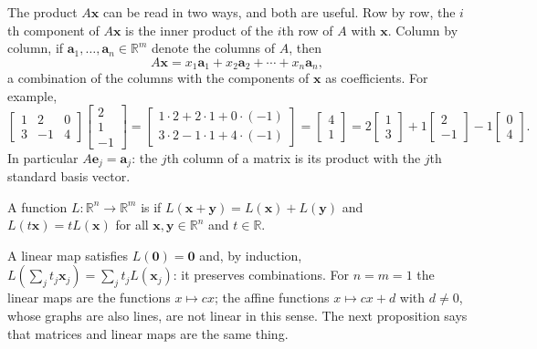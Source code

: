 The product $A\mathbf x$ can be read in two ways, and both are useful. Row by row, the $i$th component of $A\mathbf x$ is the inner product of the $i$th row of $A$ with $\mathbf x$. Column by column, if $\mathbf a_1,\ldots,\mathbf a_n\in\mathbb R^m$ denote the columns of $A$, then
\[
A\mathbf x=x_1\mathbf a_1+x_2\mathbf a_2+\cdots+x_n\mathbf a_n ,
\]
a combination of the columns with the components of $\mathbf x$ as coefficients. For example,
\[
\begin{bmatrix}1&2&0\\3&-1&4\end{bmatrix}\begin{bmatrix}2\\1\\-1\end{bmatrix}=\begin{bmatrix}1\cdot2+2\cdot1+0\cdot(-1)\\3\cdot2-1\cdot1+4\cdot(-1)\end{bmatrix}=\begin{bmatrix}4\\1\end{bmatrix}=2\begin{bmatrix}1\\3\end{bmatrix}+1\begin{bmatrix}2\\-1\end{bmatrix}-1\begin{bmatrix}0\\4\end{bmatrix}.
\]
In particular $A\mathbf e_j=\mathbf a_j$: the $j$th column of a matrix is its product with the $j$th standard basis vector.

\begin{definition}
\label{def:linear-map}
A function $L\colon\mathbb R^n\to\mathbb R^m$ is  if $L(\mathbf x+\mathbf y)=L(\mathbf x)+L(\mathbf y)$ and $L(t\mathbf x)=tL(\mathbf x)$ for all $\mathbf x,\mathbf y\in\mathbb R^n$ and $t\in\mathbb R$.
\end{definition}

A linear map satisfies $L(\mathbf 0)=\mathbf 0$ and, by induction, $L(\sum_jt_j\mathbf x_j)=\sum_jt_jL(\mathbf x_j)$: it preserves combinations. For $n=m=1$ the linear maps are the functions $x\mapsto cx$; the affine functions $x\mapsto cx+d$ with $d\ne0$, whose graphs are also lines, are not linear in this sense. The next proposition says that matrices and linear maps are the same thing.


